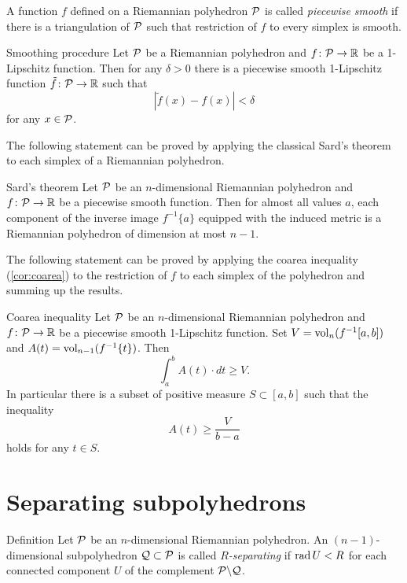 A function $f$ defined on a Riemannian polyhedron $\mathcal{P}$ is called \emph{piecewise smooth} if there is a triangulation of $\mathcal{P}$ such that restriction of $f$ to every simplex is smooth.


\begin{thm}{Smoothing procedure}\label{smoothing-procedure}
Let $\mathcal{P}$ be a Riemannian polyhedron and $f\colon\mathcal{P}\to \mathbb{R}$ be a 1-Lipschitz function.
Then for any $\delta>0$ there is a piecewise smooth 1-Lipschitz function $\tilde f\colon\mathcal{P}\to \mathbb{R}$ such that 
\[|\tilde f(x)-f(x)|<\delta\]
for any $x\in  \mathcal{P}$.
\end{thm}

The following statement can be proved by applying the classical Sard's theorem to each simplex of a Riemannian polyhedron.

\begin{thm}{Sard's theorem}\label{sard}
Let $\mathcal{P}$ be an $n$-dimensional Riemannian polyhedron and $f\colon\mathcal{P}\to \mathbb{R}$ be a piecewise smooth function.
Then for almost all values $a$, each component of the inverse image $f^{-1}\{a\}$ equipped with the induced metric is a Riemannian polyhedron of dimension at most $n-1$.
\end{thm}

The following statement can be proved by applying the coarea inequality (\ref{cor:coarea}) to the restriction of $f$ to each simplex of the polyhedron and summing up the results.

\begin{thm}{Coarea inequality}
Let $\mathcal{P}$ be an $n$-dimensional Riemannian polyhedron and $f\colon\mathcal{P}\to \mathbb{R}$ be a piecewise smooth 1-Lipschitz function.
Set $V\z=\vol_n (f^{-1}[a,b])$ and $A(t)=\operatorname{\rm vol}\nolimits_{n-1}(f^{-1}\{t\})$.
Then 
\[\int_a^bA(t)\cdot dt\ge V .\]
In particular there is a subset of positive measure $S\subset [a,b]$ such that the inequality 
\[A(t)\ge \frac V{b-a}\]
holds for any $t\in S$.
\end{thm}%

\section*{Separating subpolyhedrons}

\begin{thm}{Definition}
Let $\mathcal{P}$ be an $n$-dimensional Riemannian polyhedron.
An $(n-1)$-dimensional subpolyhedron $\mathcal{Q}\subset\mathcal{P}$ is called \emph{$R$-separating} if $\mathop{\rm rad}\nolimits U<R$ for each connected component $U$ of the complement $\mathcal{P}\backslash \mathcal{Q}$.
\end{thm}



